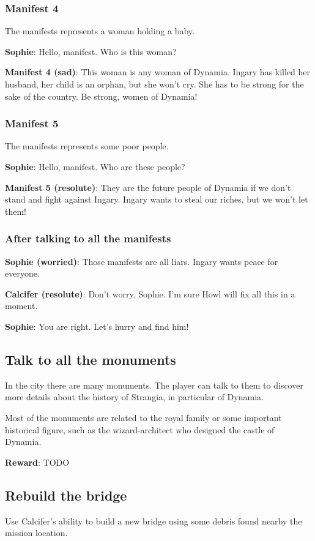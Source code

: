 \subsubsection*{Manifest 4}
The manifests represents a woman holding a baby.

\textbf{Sophie}: Hello, manifest. Who is this woman?

\textbf{Manifest 4 (sad)}: This woman is any woman of Dynamia. Ingary has killed her husband, her child is an orphan, but she won't cry. She has to be strong for the sake of the country. Be strong, women of Dynamia!

\subsubsection*{Manifest 5}
The manifests represents some poor people.

\textbf{Sophie}: Hello, manifest. Who are these people?

\textbf{Manifest 5 (resolute)}: They are the future people of Dynamia if we don't stand and fight against Ingary. Ingary wants to steal our riches, but we won't let them!

\subsubsection*{After talking to all the manifests}
\textbf{Sophie (worried)}: Those manifests are all liars. Ingary wants peace for everyone.

\textbf{Calcifer (resolute)}: Don't worry, Sophie. I'm sure Howl will fix all this in a moment.

\textbf{Sophie}: You are right. Let's hurry and find him!


\subsection{Talk to all the monuments}
In the city there are many monuments. The player can talk to them to discover more details about the history of Strangia, in particular of Dynamia.

Most of the monuments are related to the royal family or some important historical figure, such as the wizard-architect who designed the castle of Dynamia.

\textbf{Reward}: TODO


\subsection{Rebuild the bridge}
Use Calcifer's ability to build a new bridge using some debris found nearby the mission location.

